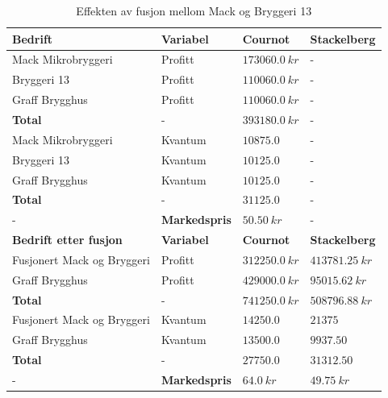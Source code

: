 \documentclass[
  12pt,
  a4paper,
  DIV=11,
  numbers=noendperiod]{scrartcl}
\begin{document}
\begin{table}[h]
\centering
\begin{tabular}{|l|l|l|l|}
\hline
\rowcolor{cornflowerblue} \textbf{Bedrift} & \textbf{Variabel} & \textbf{Cournot} & \textbf{Stackelberg} \\ \hline
\rowcolor{lighterblue} Mack Mikrobryggeri      & Profitt                  & $173060.0~kr$             & -           \\ \hline
\rowcolor{lighterblue} Bryggeri 13  & Profitt                  & $110060.0~kr$             & -           \\ \hline
\rowcolor{lighterblue} Graff Brygghus  & Profitt                  & $110060.0~kr$             & -           \\ \hline 
\textbf{Total}  & -                  & $393180.0~kr$             & -           \\ \hline
\rowcolor{lightblue} Mack Mikrobryggeri      & Kvantum                  & $10875.0$             & -           \\ \hline
\rowcolor{lightblue} Bryggeri 13  & Kvantum                  & $10125.0$             & -           \\ \hline
\rowcolor{lightblue} Graff Brygghus  & Kvantum                  & $10125.0$             & -           \\ \hline 
\textbf{Total}  & -                  & $31125.0$             & -          \\ \hline
- & \textbf{Markedspris} & $50.50~kr$ & - \\ \hline
\rowcolor{cornflowerblue} \textbf{Bedrift etter fusjon} & \textbf{Variabel} & \textbf{Cournot} & \textbf{Stackelberg} \\ \hline
\rowcolor{lighterblue} Fusjonert Mack og Bryggeri      & Profitt                  & $312250.0~kr$             & $413781.25~kr$           \\ \hline
\rowcolor{lighterblue} Graff Brygghus  & Profitt                  & $429000.0~kr$             & $95015.62~kr$           \\ \hline 
\textbf{Total}  & -                  & $741250.0~kr$             & $508796.88~kr$           \\ \hline
\rowcolor{lightblue} Fusjonert Mack og Bryggeri      & Kvantum                  & $14250.0$             & $21375$           \\ \hline
\rowcolor{lightblue} Graff Brygghus  & Kvantum                  & $13500.0$             & $9937.50$           \\ \hline
\textbf{Total}  & -                  & $27750.0$             & $31312.50$           \\ \hline
- & \textbf{Markedspris} & $64.0~kr$ & $49.75~kr$ \\ \hline
\end{tabular}
\caption{Effekten av fusjon mellom Mack og Bryggeri 13}
\label{table:3}
\end{table}
\end{document}
